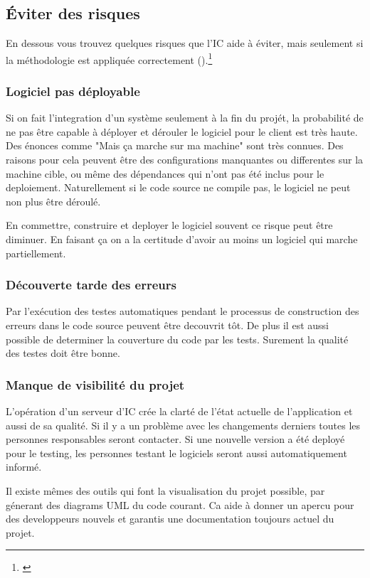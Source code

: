 \subsection{Éviter des risques}
En dessous vous trouvez quelques risques que l'IC aide à éviter, mais seulement si la méthodologie est appliquée correctement ().\footnote{\cite[p39]{duvallconint}} 
\subsubsection{Logiciel pas déployable}
Si on fait l'integration d'un système seulement à la fin du projét, la probabilité de ne pas être capable à déployer et dérouler le logiciel pour le client est très haute. Des énonces comme "Mais ça marche sur ma machine" sont très connues. Des raisons pour cela peuvent être des configurations manquantes ou differentes sur la machine cible, ou même des dépendances qui n'ont pas été inclus pour le deploiement. Naturellement si le code source ne compile pas, le logiciel ne peut non plus être déroulé.

En commettre, construire et deployer le logiciel souvent ce risque peut être diminuer. En faisant ça on a la certitude d'avoir au moins un logiciel qui marche partiellement.
\subsubsection{Découverte tarde des erreurs}
Par l'exécution des testes automatiques pendant le processus de construction des erreurs dans le code source peuvent être decouvrit tôt. De plus il est aussi possible de determiner la couverture du code par les tests. Surement la qualité des testes doit être bonne.
\subsubsection{Manque de visibilité du projet}
L'opération d'un serveur d'IC crée la clarté de l'état actuelle de l'application et aussi de sa qualité. Si il y a un problème avec les changements derniers toutes les personnes responsables seront contacter. Si une nouvelle version a été deployé pour le testing, les personnes testant le logiciels seront aussi automatiquement informé.

Il existe mêmes des outils qui font la visualisation du projet possible, par génerant des diagrams UML du code courant. Ca aide à donner un apercu pour des developpeurs nouvels et garantis une documentation toujours actuel du projet.

